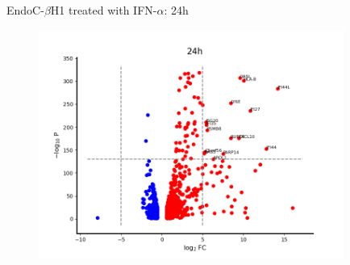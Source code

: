\documentclass{beamer}					%
\begin{document}
\begin{frame}{EndoC-$\beta$H1 treated with IFN-$\alpha$: 24h }

\begin{figure}
\includegraphics[width=10cm]{volcano-24h.png}
\end{figure}


\end{frame}
\end{document}
